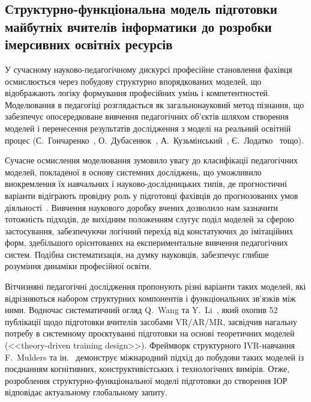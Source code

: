 \subsection{Структурно-функціональна модель підготовки майбутніх вчителів інформатики до розробки імерсивних освітніх ресурсів}\label{subsec:2.2}

У сучасному науково-педагогічному дискурсі професійне становлення фахівця осмислюється через побудову структурно впорядкованих моделей, що відображають логіку формування професійних умінь і компетентностей. Моделювання в педагогіці розглядається як загальнонауковий метод пізнання, що забезпечує опосередковане вивчення педагогічних об'єктів шляхом створення моделей і перенесення результатів дослідження з моделі на реальний освітній процес (С.~Гончаренко~\cite{Goncharenko2011Pedagogy}, О.~Дубасенюк~\cite{Dubaseniuk2008Modeling}, А.~Кузьмінський~\cite{Kuzminskyi2012Pedagogy}, Є.~Лодатко~\cite{Lodatko2011Modeling} тощо).

Сучасне осмислення моделювання зумовило увагу до класифікації педагогічних моделей, покладеної в основу системних досліджень, що уможливило виокремлення їх навчальних і науково-дослідницьких типів, де прогностичні варіанти відіграють провідну роль у підготовці фахівців до прогнозованих умов діяльності~\cite{Lodatko2011Modeling}. Вивчення наукового доробку вчених дозволило нам зазначити тотожність підходів, де вихідним положенням слугує поділ моделей за сферою застосування, забезпечуючи логічний перехід від констатуючих до імітаційних форм, здебільшого орієнтованих на експериментальне вивчення педагогічних систем. Подібна систематизація, на думку науковців, забезпечує глибше розуміння динаміки професійної освіти.

Вітчизняні педагогічні дослідження пропонують різні варіанти таких моделей, які відрізняються набором структурних компонентів і функціональних зв'язків між ними. Водночас систематичний огляд Q.~Wang та Y.~Li~\cite{Wang2024XRTeacherEd}, який охопив 52 публікації щодо підготовки вчителів засобами VR/AR/MR, засвідчив нагальну потребу в системному проєктуванні підготовки на основі теоретичних моделей (<<theory-driven training design>>). Фреймворк структурного IVR-навчання F.~Mulders та ін.~\cite{Mulders2020Framework} демонструє міжнародний підхід до побудови таких моделей із поєднанням когнітивних, конструктивістських і технологічних вимірів. Отже, розроблення структурно-функціональної моделі підготовки до створення ІОР відповідає актуальному глобальному запиту.

